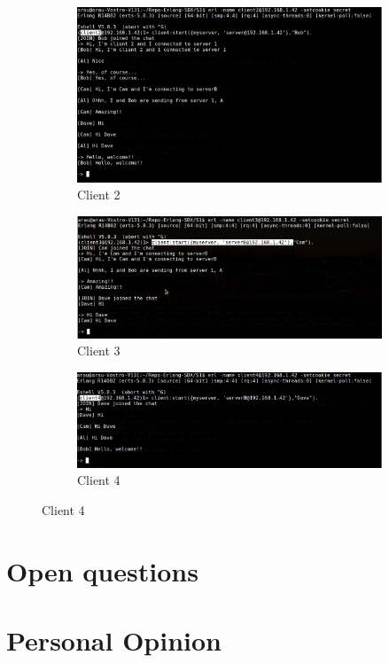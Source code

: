 \documentclass[a4paper, 11pt]{article}
\begin{document}
\begin{figure}[H]
    \centering
    
    \begin{subfigure}[b]{0.8\textwidth}
        \includegraphics[width=1.0\textwidth]{figures/Bob}
        \caption{Client 2}
        \label{fig:secondserver}
    \end{subfigure}

    \begin{subfigure}[b]{0.8\textwidth}
        \includegraphics[width=1.0\textwidth]{figures/Cam}
        \caption{Client 3}
        \label{fig:thirdserver}
    \end{subfigure} 
        
    \begin{subfigure}[b]{0.8\textwidth}
        \includegraphics[width=1.0\textwidth]{figures/Dave}
        \caption{Client 4}
        \label{fig:fourthserver}
    \end{subfigure}    

\end{figure}

\section{Open questions}


\section{Personal Opinion}

\end{document}
